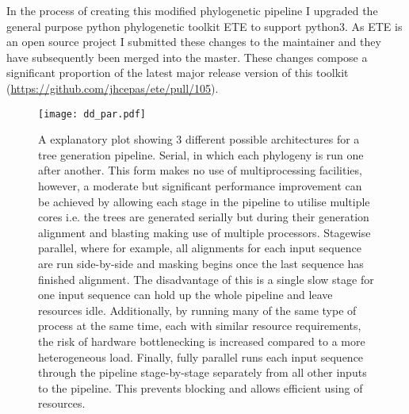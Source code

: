 In the process of creating this modified phylogenetic pipeline I upgraded the general purpose python phylogenetic toolkit
ETE \citep{Huerta-Cepas2010} to support python3.  As ETE is an open source project I submitted these changes
to the maintainer and they have subsequently been merged into the master.  These changes compose a significant proportion of
the latest major release version of this toolkit (\url{https://github.com/jhcepas/ete/pull/105}).

\begin{figure}[h!]
    \texttt{[image: dd\_par.pdf]}
    \caption[Tree generation pipeline architectures]{A explanatory plot showing 3 different possible architectures for a tree generation pipeline. 
        Serial, in which each phylogeny is run one after another.  This form makes no use of multiprocessing
        facilities, however, a moderate but significant performance improvement can be achieved by allowing
        each stage in the pipeline to utilise multiple cores i.e. the trees are generated serially but during
        their generation alignment and blasting making use of multiple processors.          
        Stagewise parallel, where for example, all alignments for each input sequence are run side-by-side 
        and masking begins once the last sequence has finished alignment.  The disadvantage of this is a single
        slow stage for one input sequence can hold up the whole pipeline and leave resources idle.  Additionally,
        by running many of the same type of process at the same time, each with similar resource requirements,
        the risk of hardware bottlenecking is increased compared to a more heterogeneous load.
        Finally, fully parallel runs each input sequence through the pipeline stage-by-stage separately
    from all other inputs to the pipeline. This prevents blocking and allows efficient using of resources.}
    \label{fig:ddg}
\end{figure}

